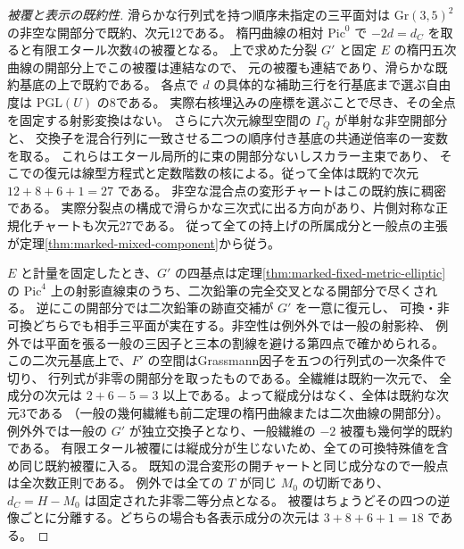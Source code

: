 \begin{proof}[被覆と表示の既約性]
滑らかな行列式を持つ順序未指定の三平面対は
$\mathrm{Gr}(3,5)^2$ の非空な開部分で既約、次元12である。
楕円曲線の相対 $\mathrm{Pic}^0$ で $-2d=d_C$ を取ると有限エタール次数4の被覆となる。
上で求めた分裂 $G'$ と固定 $E$ の楕円五次曲線の開部分上でこの被覆は連結なので、
元の被覆も連結であり、滑らかな既約基底の上で既約である。
各点で $d$ の具体的な補助三行を行基底まで選ぶ自由度は $\mathrm{PGL}(U)$ の8である。
実際右核埋込みの座標を選ぶことで尽き、その全点を固定する射影変換はない。
さらに六次元線型空間の $\Gamma_Q$ が単射な非空開部分と、
交換子を混合行列に一致させる二つの順序付き基底の共通逆倍率の一変数を取る。
これらはエタール局所的に束の開部分ないしスカラー主束であり、
そこでの復元は線型方程式と定数階数の核による。従って全体は既約で次元 $12+8+6+1=27$ である。
非空な混合点の変形チャートはこの既約族に稠密である。
実際分裂点の構成で滑らかな三次式に出る方向があり、片側対称な正規化チャートも次元27である。
従って全ての持上げの所属成分と一般点の主張が定理\ref{thm:marked-mixed-component}から従う。

$E$ と計量を固定したとき、$G'$ の四基点は定理\ref{thm:marked-fixed-metric-elliptic}の
$\mathrm{Pic}^4$ 上の射影直線束のうち、二次鉛筆の完全交叉となる開部分で尽くされる。
逆にこの開部分では二次鉛筆の跡直交補が $G'$ を一意に復元し、
可換・非可換どちらでも相手三平面が実在する。非空性は例外外では一般の射影枠、
例外では平面を張る一般の三因子と三本の割線を避ける第四点で確かめられる。
この二次元基底上で、$F'$ の空間はGrassmann因子を五つの行列式の一次条件で切り、
行列式が非零の開部分を取ったものである。全繊維は既約一次元で、
全成分の次元は $2+6-5=3$ 以上である。よって縦成分はなく、全体は既約な次元3である
（一般の幾何繊維も前二定理の楕円曲線または二次曲線の開部分）。
例外外では一般の $G'$ が独立交換子となり、一般繊維の $-2$ 被覆も幾何学的既約である。
有限エタール被覆には縦成分が生じないため、全ての可換特殊値を含め同じ既約被覆に入る。
既知の混合変形の開チャートと同じ成分なので一般点は全次数正則である。
例外では全ての $T$ が同じ $M_0$ の切断であり、$d_C=H-M_0$ は固定された非零二等分点となる。
被覆はちょうどその四つの逆像ごとに分離する。どちらの場合も各表示成分の次元は $3+8+6+1=18$ である。
\end{proof}
